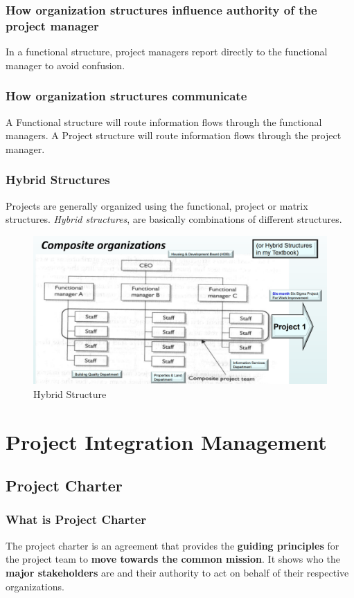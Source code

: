 \documentclass[math,code]{amznotes}
\theoremstyle{remark}
\begin{document}
\subsection{How organization structures influence authority of the project manager}
In a functional structure, project managers report directly to the functional manager to avoid confusion.

\subsection{How organization structures communicate}
A Functional structure will route information flows through the functional managers. A Project structure will route information flows through the project manager.

\subsection{Hybrid Structures}
Projects are generally organized using the functional, project or matrix structures. \textit{Hybrid structures}, are basically combinations of different structures.
\begin{figure}[h]
    \centering
    \includegraphics[width=0.75\linewidth]{images/chapter2-hybrid-structure.png}
    \caption{Hybrid Structure}
    \label{fig:chapter2-hybrid-structure}
\end{figure}

\chapter{Project Integration Management}
\section{Project Charter}
\subsection{What is Project Charter}
The project charter is an agreement that provides the \textbf{guiding principles} for the project team to \textbf{move towards the common mission}. It shows who the \textbf{major stakeholders} are and their authority to act on behalf of their respective organizations.
\end{document}
